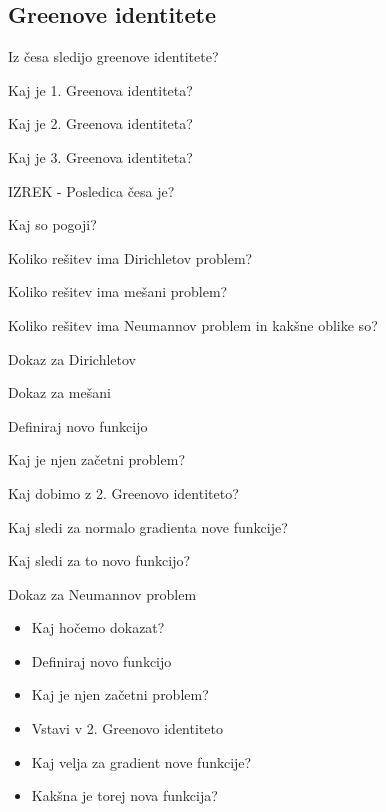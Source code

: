 \documentclass{article}
\begin{document}
    \subsection{Greenove identitete}
    \begin{enumerate}
        {\color{red}\item Iz česa sledijo greenove identitete?}
        {\color{red}\item Kaj je 1. Greenova identiteta?}
        {\color{red}\item Kaj je 2. Greenova identiteta?}
        \item Kaj je 3. Greenova identiteta?
        {\color{red}\item IZREK - Posledica česa je?}
        \begin{itemize}
            {\color{red}\item Kaj so pogoji?}
            \item Koliko rešitev ima Dirichletov problem?
            \item Koliko rešitev ima mešani problem?
            {\color{red}\item Koliko rešitev ima Neumannov problem in kakšne oblike so?}
        \end{itemize}
        \item Dokaz za Dirichletov
        \item Dokaz za mešani
        \begin{itemize}
            \item Definiraj novo funkcijo
            \item Kaj je njen začetni problem?
            {\color{red}\item Kaj dobimo z 2. Greenovo identiteto?}
            {\color{red}\item Kaj sledi za normalo gradienta nove funkcije?}
            {\color{red}\item Kaj sledi za to novo funkcijo?}
        \end{itemize}
        \item Dokaz za Neumannov problem
        \begin{itemize}
            \item Kaj hočemo dokazat?
            \item Definiraj novo funkcijo
            \item Kaj je njen začetni problem?
            \item Vstavi v 2. Greenovo identiteto
            \item Kaj velja za gradient nove funkcije?
            \item Kakšna je torej nova funkcija?
        \end{itemize}
    \end{enumerate}
\end{document}
